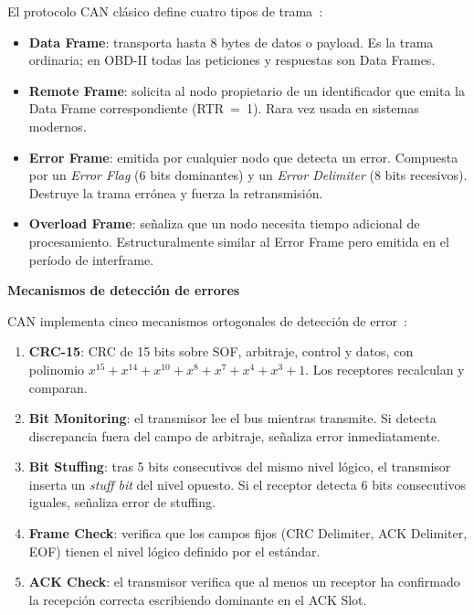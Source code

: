 El protocolo CAN clásico define cuatro tipos de trama~\cite{ISO11898-1:2024}:

\begin{itemize}
    \item \textbf{Data Frame}: transporta hasta 8 bytes de datos o payload. Es la trama ordinaria; en OBD-II todas las peticiones y respuestas son Data Frames.
    \item \textbf{Remote Frame}: solicita al nodo propietario de un identificador que emita la Data Frame correspondiente (RTR~=~1). Rara vez usada en sistemas modernos.
    \item \textbf{Error Frame}: emitida por cualquier nodo que detecta un error. Compuesta por un \textit{Error Flag} (6 bits dominantes) y un \textit{Error Delimiter} (8 bits recesivos). Destruye la trama errónea y fuerza la retransmisión.
    \item \textbf{Overload Frame}: señaliza que un nodo necesita tiempo adicional de procesamiento. Estructuralmente similar al Error Frame pero emitida en el período de interframe.
\end{itemize}

\medskip\noindent\textbf{Mecanismos de detección de errores}

CAN implementa cinco mecanismos ortogonales de detección de error~\cite{ISO11898-1:2024}:

\begin{enumerate}
    \item \textbf{CRC-15}: CRC de 15 bits sobre SOF, arbitraje, control y datos, con polinomio $x^{15}+x^{14}+x^{10}+x^8+x^7+x^4+x^3+1$. Los receptores recalculan y comparan.
    \item \textbf{Bit Monitoring}: el transmisor lee el bus mientras transmite. Si detecta discrepancia fuera del campo de arbitraje, señaliza error inmediatamente.
    \item \textbf{Bit Stuffing}: tras 5 bits consecutivos del mismo nivel lógico, el transmisor inserta un \textit{stuff bit} del nivel opuesto. Si el receptor detecta 6 bits consecutivos iguales, señaliza error de stuffing.
    \item \textbf{Frame Check}: verifica que los campos fijos (CRC Delimiter, ACK Delimiter, EOF) tienen el nivel lógico definido por el estándar.
    \item \textbf{ACK Check}: el transmisor verifica que al menos un receptor ha confirmado la recepción correcta escribiendo dominante en el ACK Slot.
\end{enumerate}

